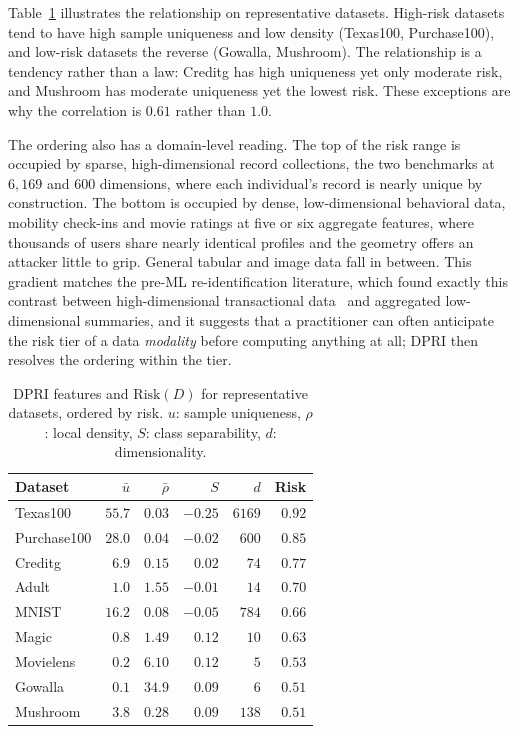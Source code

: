 Table~\ref{tab:dpri_features} illustrates the relationship on representative
datasets. High-risk datasets tend to have high sample uniqueness and low
density (Texas100, Purchase100), and low-risk datasets the reverse (Gowalla,
Mushroom). The relationship is a tendency rather than a law: Creditg has
high uniqueness yet only moderate risk, and Mushroom has moderate uniqueness
yet the lowest risk. These exceptions are why the correlation is $0.61$
rather than $1.0$.

The ordering also has a domain-level reading. The top of the risk range
is occupied by sparse, high-dimensional record collections, the two
benchmarks at $6{,}169$ and $600$ dimensions, where each individual's
record is nearly unique by construction. The bottom is occupied by
dense, low-dimensional behavioral data, mobility check-ins and movie
ratings at five or six aggregate features, where thousands of users
share nearly identical profiles and the geometry offers an attacker
little to grip. General tabular and image data fall in between. This
gradient matches the pre-ML re-identification literature, which found
exactly this contrast between high-dimensional transactional
data~\cite{narayanan2008robust,demontjoye2015unique} and aggregated
low-dimensional summaries, and it suggests that a practitioner can
often anticipate the risk tier of a data \emph{modality} before
computing anything at all; DPRI then resolves the ordering within the
tier.

\begin{table}[t]
\centering
\caption{DPRI features and $\mathrm{Risk}(D)$ for representative datasets,
         ordered by risk. $u$: sample uniqueness, $\rho$: local density,
         $S$: class separability, $d$: dimensionality.}
\label{tab:dpri_features}
\small
\setlength{\tabcolsep}{4pt}
\begin{tabular}{lrrrrr}
\toprule
\textbf{Dataset} & $\bar{u}$ & $\bar{\rho}$ & $S$ & $d$ & \textbf{Risk} \\
\midrule
Texas100     & $55.7$ & $0.03$ & $-0.25$ & $6169$ & $0.92$ \\
Purchase100  & $28.0$ & $0.04$ & $-0.02$ &  $600$ & $0.85$ \\
Creditg      &  $6.9$ & $0.15$ & $ 0.02$ &   $74$ & $0.77$ \\
Adult        &  $1.0$ & $1.55$ & $-0.01$ &   $14$ & $0.70$ \\
MNIST        & $16.2$ & $0.08$ & $-0.05$ &  $784$ & $0.66$ \\
Magic        &  $0.8$ & $1.49$ & $ 0.12$ &   $10$ & $0.63$ \\
Movielens    &  $0.2$ & $6.10$ & $ 0.12$ &    $5$ & $0.53$ \\
Gowalla      &  $0.1$ & $34.9$ & $ 0.09$ &    $6$ & $0.51$ \\
Mushroom     &  $3.8$ & $0.28$ & $ 0.09$ &  $138$ & $0.51$ \\
\bottomrule
\end{tabular}
\end{table}

